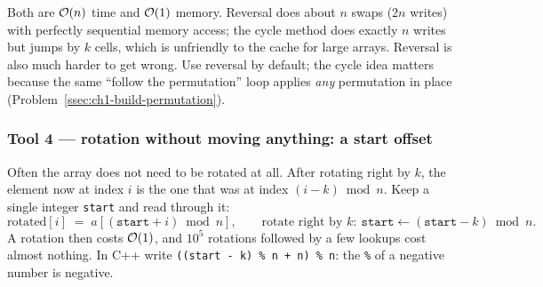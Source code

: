 \begin{insightbox}
Both are $\mathcal{O}(n)$ time and $\mathcal{O}(1)$ memory. Reversal does about $n$ swaps ($2n$ writes) with perfectly sequential memory access; the cycle method does exactly $n$ writes but jumps by $k$ cells, which is unfriendly to the cache for large arrays. Reversal is also much harder to get wrong. Use reversal by default; the cycle idea matters because the same ``follow the permutation'' loop applies \emph{any} permutation in place (Problem~\ref{ssec:ch1-build-permutation}).
\end{insightbox}

\subsubsection*{Tool 4 --- rotation without moving anything: a start offset}

Often the array does not need to be rotated at all. After rotating right by $k$, the element now at index $i$ is the one that was at index $(i - k) \bmod n$. Keep a single integer \texttt{start} and read through it:
\[
\text{rotated}[i] \;=\; a[(\texttt{start} + i) \bmod n], \qquad \text{rotate right by } k:\ \texttt{start} \leftarrow (\texttt{start} - k) \bmod n .
\]
A rotation then costs $\mathcal{O}(1)$, and $10^5$ rotations followed by a few lookups cost almost nothing. In C++ write \texttt{((start - k) \% n + n) \% n}: the \texttt{\%} of a negative number is negative.

\begin{diagrambox}
\end{diagrambox}

